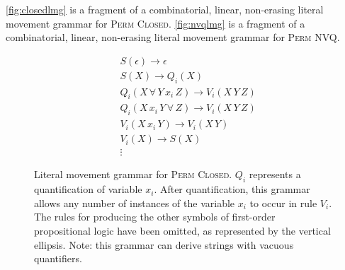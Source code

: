 \documentclass{article}
\newcommand{\pc}{\textsc{Perm Closed}}
\newcommand{\pn}{\textsc{Perm NVQ}}
\begin{document}
\autoref{fig:closedlmg} is a fragment of a combinatorial, linear, non-erasing literal movement grammar for \pc.
\autoref{fig:nvqlmg} is a fragment of a combinatorial, linear, non-erasing literal movement grammar for \pn.

\begin{figure}
  \caption{
    \label{fig:closedlmg}
    Literal movement grammar for \pc.
    $Q_i$ represents a quantification of variable $x_i$.
    After quantification, this grammar allows any number of instances of the variable $x_i$ to occur in rule $V_i$.
    The rules for producing the other symbols of first-order propositional logic have been omitted, as represented by the vertical ellipsis.
    Note: this grammar can derive strings with vacuous quantifiers.
  }
  \begin{align*}
    & S(\epsilon) \rightarrow \epsilon \\
    & S(X) \rightarrow Q_i(X) \\
    & Q_i(X \, \forall \, Y \, x_i \, Z) \rightarrow V_i(X \, Y \, Z) \\
    & Q_i(X \, x_i \, Y \, \forall \, Z) \rightarrow V_i(X\, Y \, Z) \\
    & V_i(X \, x_i \, Y) \rightarrow V_i(X \, Y) \\
    & V_i(X) \rightarrow S(X) \\
    & \vdots
  \end{align*}
\end{figure}
\end{document}
